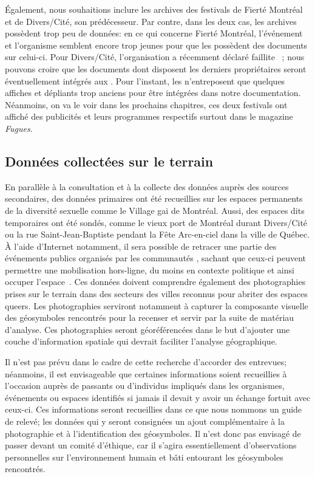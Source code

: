 Également, nous souhaitions inclure les archives des festivals de Fierté Montréal et de Divers/Cité, son prédécesseur.
Par contre, dans les deux cas, les archives possèdent trop peu de données: en ce qui concerne Fierté Montréal, l'événement et l'organisme semblent encore trop jeunes pour que les \agq{} possèdent des documents sur celui-ci.
Pour Divers/Cité, l'organisation a récemment déclaré faillite~\citep{Cormier2015} ; nous pouvons croire que les documents dont disposent les derniers propriétaires seront éventuellement intégrés aux \agq{}.
Pour l'instant, les \agq{} n'entreposent que quelques affiches et dépliants trop anciens pour être intégrées dans notre documentation.
Néanmoins, on va le voir dans les prochains chapitres, ces deux festivals ont affiché des publicités et leurs programmes respectifs surtout dans le magazine \emph{Fugues}.

\subsection{Données collectées sur le terrain}
\label{sub:donnees_collectees_sur_le_terrain}
En parallèle à la consultation et à la collecte des données auprès des sources secondaires, des données primaires ont été recueillies sur les espaces permanents de la diversité sexuelle comme le Village gai de Montréal.
Aussi, des espaces dits temporaires ont été sondés, comme le vieux port de Montréal durant Divers/Cité ou la rue Saint-Jean-Baptiste pendant la Fête Arc-en-ciel dans la ville de Québec.
À l'aide d'Internet notamment, il sera possible de retracer une partie des événements publics organisés par les communautés \lgbt{}, sachant que ceux-ci peuvent permettre une mobilisation hors-ligne, du moins en contexte politique et ainsi occuper l'espace~\citep[153-154]{Mercea2011}.
Ces données doivent comprendre également des photographies prises sur le terrain dans des secteurs des villes reconnus pour abriter des espaces queers.
Les photographies serviront notamment à capturer la composante visuelle des géosymboles rencontrés pour la recenser et servir par la suite de matériau d'analyse.
Ces photographies seront géoréférencées dans le but d'ajouter une couche d'information spatiale qui devrait faciliter l'analyse géographique.

Il n'est pas prévu dans le cadre de cette recherche d'accorder des entrevues; néanmoins, il est envisageable que certaines informations soient recueillies à l'occasion auprès de passants ou d'individus impliqués dans les organismes, événements ou espaces identifiés si jamais il devait y avoir un échange fortuit avec ceux-ci.
Ces informations seront recueillies dans ce que nous nommons un guide de relevé; les données qui y seront consignées un ajout complémentaire à la photographie et à l'identification des géosymboles.
Il n'est donc pas envisagé de passer devant un comité d'éthique, car il s'agira essentiellement d'observations personnelles sur l'environnement humain et bâti entourant les géosymboles rencontrés.

